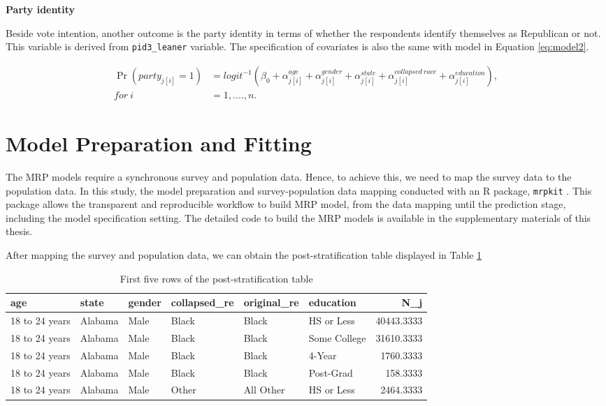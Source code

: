 \documentclass{monashthesis}
\begin{document}
\textbf{Party identity}

Beside vote intention, another outcome is the party identity in terms of whether the respondents identify themselves as Republican or not. This variable is derived from \texttt{pid3\_leaner} variable. The specification of covariates is also the same with model in Equation \eqref{eq:model2}.

\begin{equation} 
\begin{split}
\Pr(party_{j[i]} = 1) &= logit^{-1}\left(\beta_0 + \alpha^{age}_{j[i]} + \alpha^{gender}_{j[i]} + \alpha^{state}_{j[i]} + \alpha^{collapsed\ race}_{j[i]} + \alpha^{education}_{j[i]}\right), \\
for\ i &= 1, ...., n.
\end{split}
\label{eq:model4b}
\end{equation}

\hypertarget{prep}{%
\section{Model Preparation and Fitting}\label{prep}}

The MRP models require a synchronous survey and population data. Hence, to achieve this, we need to map the survey data to the population data. In this study, the model preparation and survey-population data mapping conducted with an R package, \texttt{mrpkit} \autocite{mrpkit}. This package allows the transparent and reproducible workflow to build MRP model, from the data mapping until the prediction stage, including the model specification setting. The detailed code to build the MRP models is available in the supplementary materials of this thesis.

After mapping the survey and population data, we can obtain the post-stratification table displayed in Table \ref{tab:post-strat-table}

\begin{table}

\caption{\label{tab:post-strat-table}First five rows of the post-stratification table}
\centering
\begin{tabular}[t]{llllllr}
\toprule
age & state & gender & collapsed\_re & original\_re & education & N\_j\\
\midrule
18 to 24 years & Alabama & Male & Black & Black & HS or Less & 40443.3333\\
18 to 24 years & Alabama & Male & Black & Black & Some College & 31610.3333\\
18 to 24 years & Alabama & Male & Black & Black & 4-Year & 1760.3333\\
18 to 24 years & Alabama & Male & Black & Black & Post-Grad & 158.3333\\
18 to 24 years & Alabama & Male & Other & All Other & HS or Less & 2464.3333\\
\bottomrule
\end{tabular}
\end{table}
\end{document}
